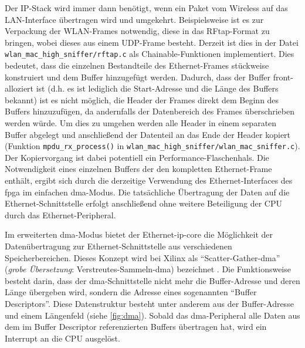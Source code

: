 \documentclass[ngerman,]{scrartcl}
\begin{document}
Der IP-Stack wird immer dann benötigt, wenn ein Paket vom Wireless auf
das LAN-Interface übertragen wird und umgekehrt. Beispielsweise ist es
zur Verpackung der WLAN-Frames notwendig, diese in das RFtap-Format zu
bringen, wobei dieses aus einem UDP-Frame besteht. Derzeit ist dies in
der Datei \texttt{wlan\_mac\_high\_sniffer/rftap.c} als
Chainable-Funktionen implementiert. Dies bedeutet, dass die einzelnen
Bestandteile des Ethernet-Frames stückweise konstruiert und dem Buffer
hinzugefügt werden. Dadurch, dass der Buffer front-alloziert ist (d.h.
es ist lediglich die Start-Adresse und die Länge des Buffers bekannt)
ist es nicht möglich, die Header der Frames direkt dem Beginn des
Buffers hinzuzufügen, da andernfalls der Datenbereich des Frames
überschrieben werden würde. Um dies zu umgehen werden alle Header in
einem separaten Buffer abgelegt und anschließend der Datenteil an das
Ende der Header kopiert (Funktion \texttt{mpdu\_rx\_process()} in
\texttt{wlan\_mac\_high\_sniffer/wlan\_mac\_sniffer.c}). Der
Kopiervorgang ist dabei potentiell ein Performance-Flaschenhals. Die
Notwendigkeit eines einzelnen Buffers der den kompletten Ethernet-Frame
enthält, ergibt sich durch die derzeitige Verwendung des
Ethernet-Interfaces des \ac{fpga} im einfachen \ac{dma}-Modus. Die
tatsächliche Übertragung der Daten auf die Ethernet-Schnittstelle
erfolgt anschließend ohne weitere Beteiligung der CPU durch das
Ethernet-Peripheral.

Im erweiterten \ac{dma}-Modus bietet der Ethernet-\ac{ip-core} die
Möglichkeit der Datenübertragung zur Ethernet-Schnittstelle aus
verschiedenen Speicherbereichen. Dieses Konzept wird bei Xilinx als
``Scatter-Gather-\ac{dma}'' (\emph{grobe Übersetzung}:
Verstreutes-Sammeln-\ac{dma}) bezeichnet
\autocite{xilinx-ethernet-core}. Die Funktionsweise besteht darin, dass
der \ac{dma}-Schnittstelle nicht mehr die Buffer-Adresse und deren Länge
übergeben wird, sondern die Adresse eines sogenannten ``Buffer
Descriptors''. Diese Datenstruktur besteht unter anderem aus der
Buffer-Adresse und einem Längenfeld (siehe
\cref{fig:dma}). Sobald das \ac{dma}-Peripheral alle
Daten aus dem im Buffer Descriptor referenzierten Buffers übertragen
hat, wird ein Interrupt an die CPU ausgelöst.
\end{document}
